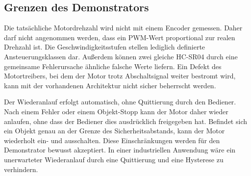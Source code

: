 \subsection{Grenzen des Demonstrators}
\label{sec:limits}

Die tatsächliche Motordrehzahl wird nicht mit einem Encoder gemessen. Daher darf
nicht angenommen werden, dass ein PWM-Wert proportional zur realen Drehzahl ist.
Die Geschwindigkeitsstufen stellen lediglich definierte Ansteuerungsklassen dar.
Außerdem können zwei gleiche HC-SR04 durch eine gemeinsame Fehlerursache
ähnliche falsche Werte liefern. Ein Defekt des Motortreibers, bei dem der Motor
trotz Abschaltsignal weiter bestromt wird, kann mit der vorhandenen Architektur
nicht sicher beherrscht werden.

Der Wiederanlauf erfolgt automatisch, ohne Quittierung durch den Bediener.
Nach einem Fehler oder einem Objekt-Stopp kann der Motor daher wieder anlaufen,
ohne dass der Bediener dies ausdrücklich freigegeben hat. Befindet sich ein
Objekt genau an der Grenze des Sicherheitsabstands, kann der Motor
wiederholt ein- und ausschalten. Diese Einschränkungen werden für den
Demonstrator bewusst akzeptiert. In einer industriellen Anwendung wäre ein
unerwarteter Wiederanlauf durch eine Quittierung und eine Hysterese zu
verhindern.

